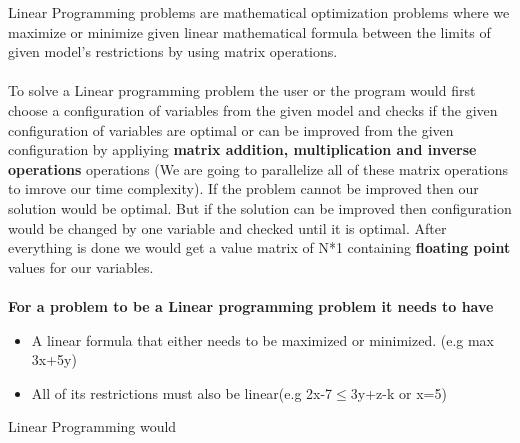Linear Programming problems are mathematical optimization problems where we maximize or minimize given linear mathematical formula between the limits of given model's restrictions by using matrix operations.\\
\\
To solve a Linear programming problem the user or the program would first choose a configuration of variables from the given model and checks if the given configuration of variables are optimal or can be improved from the given configuration by appliying \textbf{matrix addition, multiplication and inverse operations} operations (We are going to parallelize all of these matrix operations to imrove our time complexity). If the problem cannot be improved then our solution would be optimal. But if the solution can be improved then configuration would be changed by one variable and checked until it is optimal. After everything is done we would get a value matrix of N*1 containing \textbf{floating point} values for our variables.\\
\\
\textbf{For a problem to be a Linear programming problem it needs to have}
\begin{itemize}
	\item A linear formula that either needs to be maximized or minimized. (e.g max 3x+5y)
	\item All of its restrictions must also be linear(e.g 2x-7$\leq$3y+z-k or x=5)
\end{itemize}
Linear Programming would